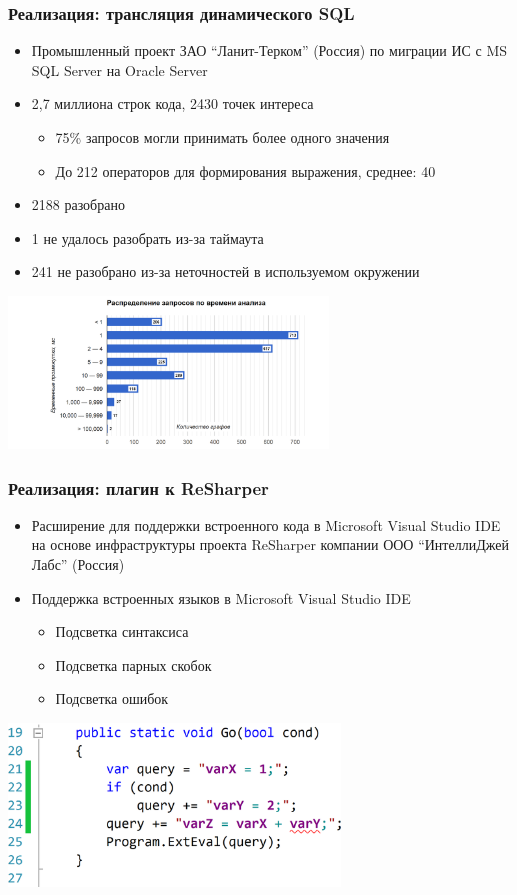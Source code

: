 \documentclass{beamer}
\begin{document}
\begin{frame}[t]
    \transwipe[direction=90]
    \frametitle{Реализация: трансляция динамического SQL}
    \begin{itemize}
    \item Промышленный проект ЗАО ``Ланит-Терком'' (Россия) по миграции ИС с MS SQL Server на Oracle Server
    \item 2,7 миллиона строк кода, 2430 точек интереса
        \begin{itemize}
            \item 75\% запросов могли принимать более одного значения
            \item До 212 операторов для формирования выражения, среднее: 40  
        \end{itemize}
    \item 2188 разобрано
    \item 1 не удалось разобрать из-за таймаута
    \item 241 не разобрано из-за неточностей в используемом окружении
  \end{itemize}
  \includegraphics[width=8.5cm]{pictures/dist.png}
\end{frame}

\begin{frame}[t]
    \transwipe[direction=90]
    \frametitle{Реализация: плагин к ReSharper}
        \begin{itemize}
            \item Расширение для поддержки встроенного кода в Microsoft Visual Studio IDE на основе инфраструктуры проекта ReSharper компании ООО “ИнтеллиДжей Лабс” (Россия)
            \item Поддержка встроенных языков в Microsoft Visual Studio IDE
            \begin{itemize}
                \item Подсветка синтаксиса
                \item Подсветка парных скобок
                \item Подсветка ошибок
            \end{itemize}
        \end{itemize}
    \begin{center}
      \includegraphics[width=250pt]{pictures/RShExampe.png}
    \end{center}
\end{frame}
\end{document}
